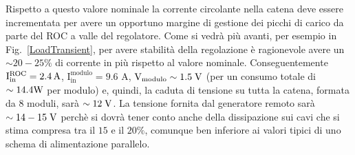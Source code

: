 Rispetto a questo valore nominale la corrente circolante nella catena deve essere incrementata per avere un opportuno margine di gestione dei picchi di carico da parte del ROC a valle del regolatore. Come si vedr\`a pi\`u avanti, per esempio in Fig.~\ref{LoadTransient}, per avere stabilit\`a della regolazione \`e ragionevole avere un $\sim20-25\%$ di corrente in pi\`u rispetto al valore nominale.
Conseguentemente $\mathrm{I^{ROC}_{in}=2.4}\rm \, A$, $\mathrm{I_{in}^{modulo}=9.6}$ A, $\mathrm{V_{modulo}\sim1.5} \rm \; V$ (per un consumo totale di $\sim14.4{\mathrm W}$ per modulo) e, quindi, la caduta di tensione su tutta la catena, formata da 8 moduli, sarà $\sim 12\rm \; V$.
La tensione fornita dal generatore remoto sar\`a $\sim 14-15\rm \; V$ perch\`e si dovr\`a tener conto anche della dissipazione sui cavi che si stima compresa tra il $15$ e il $20\%$, comunque ben inferiore ai valori tipici di uno schema di alimentazione parallelo.
 

